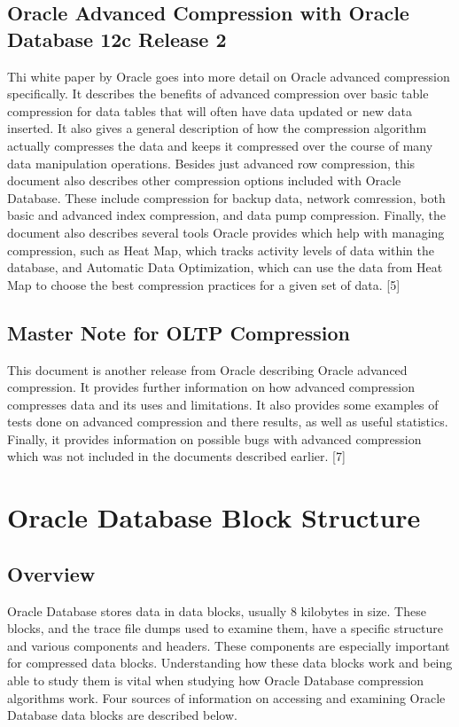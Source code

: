 \documentclass[10pt]{article}
\begin{document}
\subsection{Oracle Advanced Compression with Oracle Database 12c Release 2}

Thi white paper by Oracle goes into more detail on Oracle advanced compression specifically. 
It describes the benefits of advanced compression over basic table compression for data tables that will often have data updated or new data inserted. 
It also gives a general description of how the compression algorithm actually compresses the data and keeps it compressed over the course of many data manipulation operations. 
Besides just advanced row compression, this document also describes other compression options included with Oracle Database.
These include compression for backup data, network comression, both basic and advanced index compression, and data pump compression. 
Finally, the document also describes several tools Oracle provides which help with managing compression, such as Heat Map, which tracks activity levels of data within the database, and Automatic Data Optimization, which can use the data from Heat Map to choose the best compression practices for a given set of data. [5]

\subsection{Master Note for OLTP Compression}

This document is another release from Oracle describing Oracle advanced compression. 
It provides further information on how advanced compression compresses data and its uses and limitations. 
It also provides some examples of tests done on advanced compression and there results, as well as useful statistics. 
Finally, it provides information on possible bugs with advanced compression which was not included in the documents described earlier. [7]

\section{Oracle Database Block Structure}
\subsection{Overview}

Oracle Database stores data in data blocks, usually 8 kilobytes in size.
These blocks, and the trace file dumps used to examine them, have a specific structure and various components and headers.
These components are especially important for compressed data blocks. 
Understanding how these data blocks work and being able to study them is vital when studying how Oracle Database compression algorithms work. 
Four sources of information on accessing and examining Oracle Database data blocks are described below. 
\end{document}
